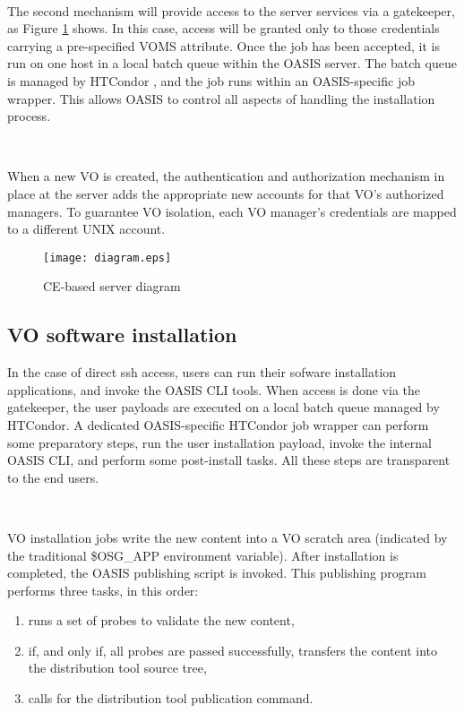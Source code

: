 \documentclass[a4paper]{jpconf}
\begin{document}
~

The second mechanism will provide access to the server services via a
gatekeeper, as Figure \ref{ceserver} shows.
In this case, access will be granted only to those credentials carrying a
pre-specified VOMS \cite{voms} attribute.
Once the job has been accepted, it is run on one host in a local batch queue within the OASIS server. 
The batch queue is managed by HTCondor \cite{condor}, and the job runs within an
OASIS-specific job wrapper. This allows OASIS to control all aspects of handling
the installation process. 

~

When a new VO is created, the authentication and authorization mechanism 
in place at the server adds the appropriate new accounts for that VO's authorized managers. 
To guarantee VO isolation, each VO manager's credentials are mapped to a different UNIX account.

\begin{figure}[b]
\centering\texttt{[image: diagram.eps]}
%
%
\caption{CE-based server diagram}
\label{ceserver}
\end{figure}

\subsection{VO software installation}

In the case of direct ssh access, users can run their sofware installation applications, 
and invoke the OASIS CLI tools.
When access is done via the gatekeeper, the user payloads are executed on a local batch queue managed by HTCondor.
A dedicated OASIS-specific HTCondor job wrapper can perform some preparatory
steps, run the user installation payload,
invoke the internal OASIS CLI,
and perform some post-install tasks. 
All these steps are transparent to the end users.

~

VO installation jobs write the new content into a VO scratch area (indicated by
the traditional \$OSG\_APP environment variable).
After installation is completed, the OASIS publishing script is invoked. 
This publishing program performs three tasks, in this order:

\begin{enumerate}
    \item runs a set of probes to validate the new content,
    \item if, and only if, all probes are passed successfully,
          transfers the content into the distribution tool source tree,
    \item calls for the distribution tool publication command.
\end{enumerate}
\end{document}
